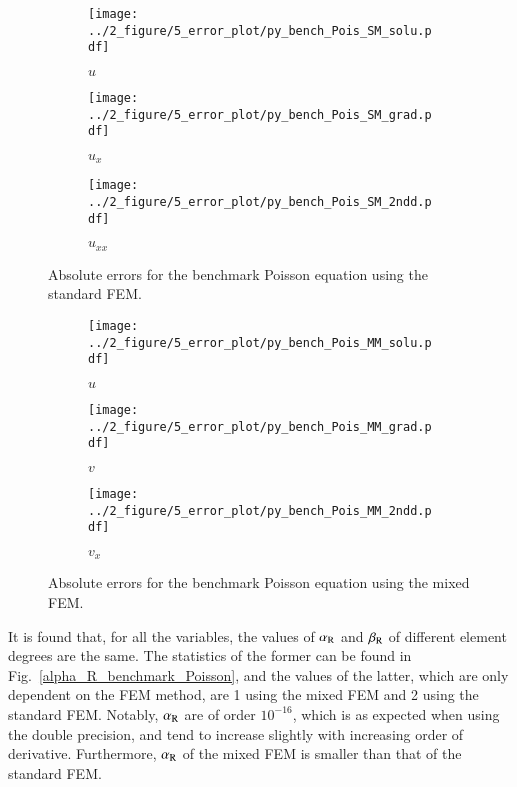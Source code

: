 \documentclass[review,3p]{elsarticle}
\begin{document}
\begin{figure}[!ht]
    \begin{subfigure}{5.5cm}
        \texttt{[image: ../2\_figure/5\_error\_plot/py\_bench\_Pois\_SM\_solu.pdf]}
        \caption{$u$}
        \label{py_bench_Pois_SM_solu}
    \end{subfigure}
    \hspace{-0.2cm}
    \begin{subfigure}{5.5cm}
        \texttt{[image: ../2\_figure/5\_error\_plot/py\_bench\_Pois\_SM\_grad.pdf]}
        \caption{$u_x$}
        \label{py_bench_Pois_SM_grad}
    \end{subfigure}
    \hspace{-0.2cm}
    \begin{subfigure}{5.5cm}
        \texttt{[image: ../2\_figure/5\_error\_plot/py\_bench\_Pois\_SM\_2ndd.pdf]}
        \caption{$u_{xx}$}
        \label{py_bench_Pois_SM_2ndd}
    \end{subfigure}
\caption{Absolute errors for the benchmark Poisson equation using the standard FEM.}
\label{py_bench_Pois_SM}
\end{figure}

\begin{figure}[!ht]
    \begin{subfigure}{5.5cm}
        \texttt{[image: ../2\_figure/5\_error\_plot/py\_bench\_Pois\_MM\_solu.pdf]}
        \caption{$u$}
        \label{py_bench_Pois_MM_solu}
    \end{subfigure}
    \hspace{-0.2cm}
    \begin{subfigure}{5.5cm}
        \texttt{[image: ../2\_figure/5\_error\_plot/py\_bench\_Pois\_MM\_grad.pdf]}
        \caption{$v$}
        \label{py_bench_Pois_MM_grad}
    \end{subfigure}
    \hspace{-0.2cm}
    \begin{subfigure}{5.5cm}
        \texttt{[image: ../2\_figure/5\_error\_plot/py\_bench\_Pois\_MM\_2ndd.pdf]}
        \caption{$v_x$}
        \label{py_bench_Pois_MM_2ndd}
    \end{subfigure}
\caption{Absolute errors for the benchmark Poisson equation using the mixed FEM.}
\label{py_bench_Pois_MM}
\end{figure}

It is found that, for all the variables, the values of $\alpha_{\rm R}$ and $\beta_{\rm R}$ of different element degrees are the same. The statistics of the former can be found in Fig.~\ref{alpha_R_benchmark_Poisson}, and the values of the latter, which are only dependent on the FEM method, are 1 using the mixed FEM and 2 using the standard FEM. Notably, $\alpha_{\rm R}$ are of order $10^{-16}$, which is as expected when using the double precision, and tend to increase slightly with increasing order of derivative. Furthermore, $\alpha_{\rm R}$ of the mixed FEM is smaller than that of the standard FEM.  
\end{document}
